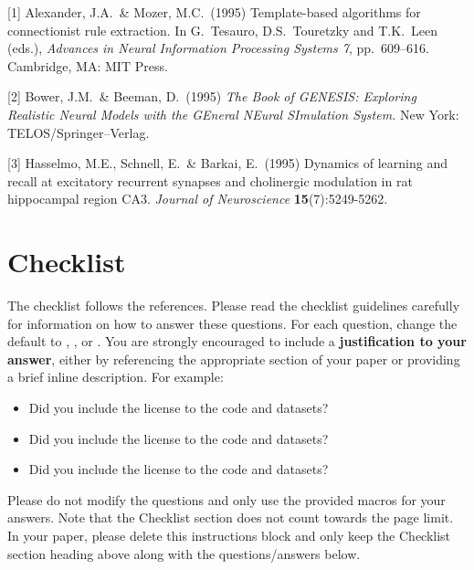 \documentclass{article}
\begin{document}
{
\small

[1] Alexander, J.A.\ \& Mozer, M.C.\ (1995) Template-based algorithms for
connectionist rule extraction. In G.\ Tesauro, D.S.\ Touretzky and T.K.\ Leen
(eds.), {\it Advances in Neural Information Processing Systems 7},
pp.\ 609--616. Cambridge, MA: MIT Press.

[2] Bower, J.M.\ \& Beeman, D.\ (1995) {\it The Book of GENESIS: Exploring
  Realistic Neural Models with the GEneral NEural SImulation System.}  New York:
TELOS/Springer--Verlag.

[3] Hasselmo, M.E., Schnell, E.\ \& Barkai, E.\ (1995) Dynamics of learning and
recall at excitatory recurrent synapses and cholinergic modulation in rat
hippocampal region CA3. {\it Journal of Neuroscience} {\bf 15}(7):5249-5262.
}

\section*{Checklist}

The checklist follows the references.  Please
read the checklist guidelines carefully for information on how to answer these
questions.  For each question, change the default \answerTODO{} to \answerYes{},
\answerNo{}, or \answerNA{}.  You are strongly encouraged to include a {\bf
justification to your answer}, either by referencing the appropriate section of
your paper or providing a brief inline description.  For example:
\begin{itemize}
  \item Did you include the license to the code and datasets? 
  \item Did you include the license to the code and datasets? 
  \item Did you include the license to the code and datasets? \answerNA{}
\end{itemize}
Please do not modify the questions and only use the provided macros for your
answers.  Note that the Checklist section does not count towards the page
limit.  In your paper, please delete this instructions block and only keep the
Checklist section heading above along with the questions/answers below.
\end{document}
